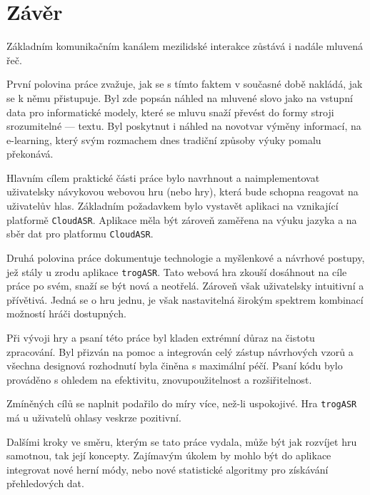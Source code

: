 \chapter*{Závěr}

Základním komunikačním kanálem mezilidské interakce zůstává i nadále mluvená řeč.

První polovina práce zvažuje, jak se s tímto faktem v současné době nakládá, jak se k němu přistupuje. Byl zde popsán náhled na mluvené slovo jako na vstupní data pro informatické modely, které se mluvu snaží převést do formy stroji srozumitelné --- textu. Byl poskytnut i náhled na novotvar výměny informací, na e-learning, který svým rozmachem dnes tradiční způsoby výuky pomalu překonává.

Hlavním cílem praktické části práce bylo navrhnout a naimplementovat uživatelsky návykovou webovou hru (nebo hry), která bude schopna reagovat na uživatelův hlas. Základním požadavkem bylo vystavět aplikaci na vznikající platformě \verb|CloudASR|. Aplikace měla být zároveň zaměřena na výuku jazyka a na sběr dat pro platformu \verb|CloudASR|.

Druhá polovina práce dokumentuje technologie a myšlenkové a návrhové postupy, jež stály u zrodu aplikace \verb|trogASR|. Tato webová hra zkouší dosáhnout na cíle práce po svém, snaží se být nová a neotřelá. Zároveň však uživatelsky intuitivní a přívětivá. Jedná se o hru jednu, je však nastavitelná širokým spektrem kombinací možností hráči dostupných.

Při vývoji hry a psaní této práce byl kladen extrémní důraz na čistotu zpracování. Byl přizván na pomoc a integrován celý zástup návrhových vzorů a všechna designová rozhodnutí byla činěna s maximální péčí. Psaní kódu bylo prováděno s ohledem na efektivitu, znovupoužitelnost a rozšiřitelnost.

Zmíněných cílů se naplnit podařilo do míry více, než-li uspokojivé. Hra \verb|trogASR| má u uživatelů ohlasy veskrze pozitivní.

Dalšími kroky ve směru, kterým se tato práce vydala, může být jak rozvíjet hru samotnou, tak její koncepty. Zajímavým úkolem by mohlo být do aplikace integrovat nové herní módy, nebo nové statistické algoritmy pro získávání přehledových dat.